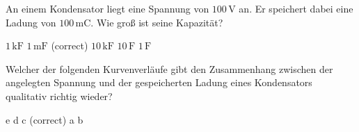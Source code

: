 \documentclass[11pt]{exam}
\begin{document}
\begin{questions}
\vspace{3mm}\question An einem Kondensator liegt eine Spannung von \(\mathrm{100\,V}\) an. Er speichert dabei eine Ladung von \(\mathrm{100\,mC}\). Wie groß ist seine Kapazität?

\begin{choices}
	\choice \(\mathrm{1\,kF}\)
	\choice \(\mathrm{1\,mF}\) (correct)
	\choice \(\mathrm{10\,kF}\)
	\choice \(\mathrm{10\,F}\)
	\choice \(\mathrm{1\,F}\)
\end{choices}

\vspace{3mm}\question Welcher der folgenden Kurvenverläufe gibt den Zusammenhang zwischen der angelegten Spannung und der gespeicherten Ladung eines Kondensators qualitativ richtig wieder?

\begin{choices}
	\choice e
	\choice d
	\choice c (correct)
	\choice a
	\choice b
\end{choices}

\vspace{3mm}\end{questions}
\end{document}
